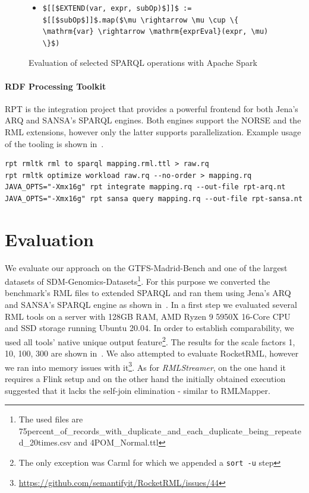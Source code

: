 \begin{figure}[htb]
\begin{itemize}
\item \begin{lstlisting}[mathescape=true]
$[[$EXTEND(var, expr, subOp)$]]$ := $[[$subOp$]]$.map($\mu \rightarrow \mu \cup \{ \mathrm{var} \rightarrow \mathrm{exprEval}(expr, \mu) \}$)
\end{lstlisting}
\end{itemize}
\vspace*{-5mm}
\caption{Evaluation of selected SPARQL operations with Apache Spark}
\label{lst:sparql-to-spark}
\end{figure}

\paragraph{RDF Processing Toolkit} RPT is the integration project that provides a powerful frontend for both Jena's ARQ and SANSA's SPARQL engines. Both engines support the NORSE and the RML extensions, however only the latter supports parallelization. Example usage of the tooling is shown in~.

\begin{lstlisting}[label=lst:usage, basicstyle=\footnotesize, caption=Example for using RPT to translate and execute RML]
rpt rmltk rml to sparql mapping.rml.ttl > raw.rq
rpt rmltk optimize workload raw.rq --no-order > mapping.rq
JAVA_OPTS="-Xmx16g" rpt integrate mapping.rq --out-file rpt-arq.nt
JAVA_OPTS="-Xmx16g" rpt sansa query mapping.rq --out-file rpt-sansa.nt
\end{lstlisting}


\section{Evaluation}
\label{sec:eval}
We evaluate our approach on the GTFS-Madrid-Bench and one of the largest datasets of SDM-Genomics-Datasets\footnote{The used files are 75percent\_of\_records\_with\_duplicate\_and\_each\_duplicate\_being\_repeated\_20times.csv and 4POM\_Normal.ttl}.
For this purpose we converted the benchmark's RML files to extended SPARQL and ran them using Jena's ARQ and SANSA's SPARQL engine as shown in~.
In a first step we evaluated several RML tools on a server with 128GB RAM, AMD Ryzen 9 5950X 16-Core CPU and SSD storage running Ubuntu 20.04.
In order to establish comparability, we used all tools' native unique output feature\footnote{The only exception was Carml for which we appended a \texttt{sort -u} step}. The results for the scale factors 1, 10, 100, 300 are shown in~.
We also attempted to evaluate RocketRML, however we ran into memory issues with it\footnote{\url{https://github.com/semantifyit/RocketRML/issues/44}}.
As for \emph{RMLStreamer}\cite{Haesendonck2019}, on the one hand it requires a Flink setup and on the other hand the initially obtained execution suggested that it lacks the self-join elimination - similar to RMLMapper.

